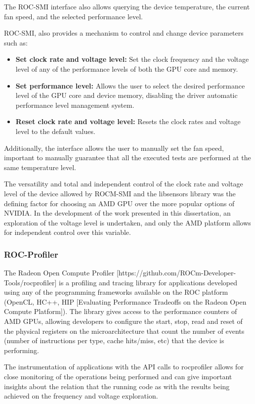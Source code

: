 The ROC-SMI interface also allows querying the device temperature, the current fan speed, and the selected performance level.

ROC-SMI, also provides a mechanism to control and change device parameters such as:
\begin{itemize}
\item \textbf{Set clock rate and voltage level:} Set the clock frequency and the voltage level of any of the performance levels of both the GPU core and memory. 
\item \textbf{Set performance level:} Allows the user to select the desired performance level of the GPU core and device memory, disabling the driver automatic performance level management system.
\item \textbf{Reset clock rate and voltage level:} Resets the clock rates and voltage level to the default values.
\end{itemize}

Additionally, the interface allows the user to manually set the fan speed, important to manually guarantee that all the executed tests are performed at the same temperature level.

The versatility and total and independent control of the clock rate and voltage level of the device allowed by ROCM-SMI and the libsensors library was the defining factor for choosing an AMD GPU over the more popular options of NVIDIA. In the development of the work presented in this dissertation, an exploration of the voltage level is undertaken, and only the AMD platform allows for independent control over this variable.

\subsubsection{ROC-Profiler}

The Radeon Open Compute Profiler [https://github.com/ROCm-Developer-Tools/rocprofiler] is a profiling and tracing library for applications developed using any of the programming frameworks available on the ROC platform (OpenCL, HC++, HIP [Evaluating Performance Tradeoffs on the Radeon Open Compute Platform]). The library gives access to the performance counters of AMD GPUs, allowing developers to configure the start, stop, read and reset of the physical registers on the microarchitecture that count the number of events (number of instructions per type, cache hits/miss, etc) that the device is performing.

The instrumentation of applications with the API calls to rocprofiler allows for close monitoring of the operations being performed and can give important insights about the relation that the running code as with the results being achieved on the frequency and voltage exploration.


